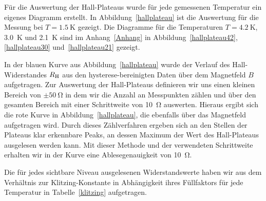 \documentclass[paper=a4,fontsize=10pt,DIV=18,twocolumn,parskip=half]{scrartcl}
\numberwithin{equation}{section}    %
\begin{document}
Für die Auswertung der Hall-Plateaus wurde für jede gemessenen Temperatur ein eigenes Diagramm erstellt. In Abbildung~\ref{hallplateau} ist die Auswertung für die Messung bei $T=\SI{1.5}{\kelvin}$ gezeigt. Die Diagramme für die Temperaturen $T = \SI{4.2}{\kelvin}$, \SI{3.0}{\kelvin} und \SI{2.1}{\kelvin} sind im Anhang~\ref{Anhang} in Abbildung~\ref{hallplateau42}, \ref{hallplateau30} und~\ref{hallplateau21} gezeigt.

In der blauen Kurve aus Abbildung~\ref{hallplateau} wurde der Verlauf des Hall-Widerstandes $R_{\rm H}$ aus den hysterese-bereinigten Daten über dem Magnetfeld $B$ aufgetragen.
Zur Auswertung der Hall-Plateaus definieren wir uns einen kleinen Bereich von $\pm \SI{50}{\ohm}$ in dem wir die Anzahl an Messpunkten zählen und über den gesamten Bereich mit einer Schrittweite von \SI{10}{\ohm} auswerten. Hieraus ergibt sich die rote Kurve in Abbildung~\ref{hallplateau}, die ebenfalls über das Magnetfeld aufgetragen wird. Durch dieses Zählverfahren ergeben sich an den Stellen der Plateaus klar erkennbare Peaks, an dessen Maximum der Wert des Hall-Plateaus ausgelesen werden kann. Mit dieser Methode und der verwendeten Schrittweite erhalten wir in der Kurve eine Ablesegenauigkeit von \SI{10}{\ohm}.

Die für jedes sichtbare Niveau ausgelesenen Widerstandswerte haben wir aus dem Verhältnis zur Klitzing-Konstante in Abhängigkeit ihres Füllfaktors für jede Temperatur in Tabelle~\ref{klitzing} aufgetragen.
\end{document}
